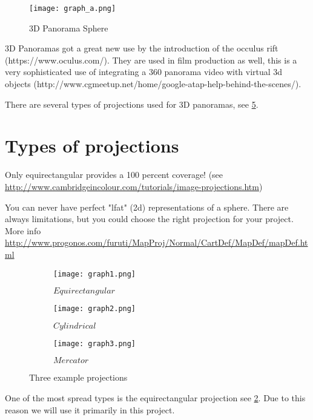 \begin{figure}[h]
	\centering
	\texttt{[image: graph\_a.png]}
	\caption{3D Panorama Sphere}
	\label{fig:3d_panorama_sphere}
\end{figure}

3D Panoramas got a great new use by the introduction of the occulus rift (https://www.oculus.com/). They are used in film production as well, this is a very sophisticated use of integrating a 360 panorama video with virtual 3d objects (http://www.cgmeetup.net/home/google-atap-help-behind-the-scenes/).

There are several types of projections used for 3D panoramas, see \ref{fig:three_projections}.


\section{Types of projections} \label{section_types_of_projections}

Only equirectangular provides a 100 percent coverage! (see \url{http://www.cambridgeincolour.com/tutorials/image-projections.htm})

You can never have perfect "lfat" (2d) representations of a sphere. There are always limitations, but you could choose the right projection for your project. More info \url{http://www.progonos.com/furuti/MapProj/Normal/CartDef/MapDef/mapDef.html}


\begin{figure}[h]
	\centering
	\begin{subfigure}[b]{0.3\textwidth}
		\centering
		\texttt{[image: graph1.png]}
		\caption{$Equirectangular$}
		\label{fig:equirectangular}
	\end{subfigure}
	\hfill
	\begin{subfigure}[b]{0.3\textwidth}
		\centering
		\texttt{[image: graph2.png]}
		\caption{$Cylindrical$}
		\label{fig:cylindrical}
	\end{subfigure}
	\hfill
	\begin{subfigure}[b]{0.3\textwidth}
		\centering
		\texttt{[image: graph3.png]}
		\caption{$Mercator$}
		\label{fig:mercator}
	\end{subfigure}
	\caption{Three example projections}
	\label{fig:three_projections}
\end{figure}

One of the most spread types is the equirectangular projection see \ref{fig:equirectangular}. Due to this reason we will use it primarily in this project.

